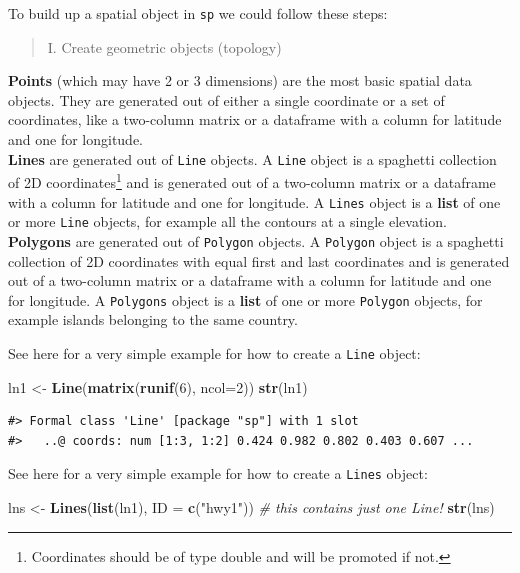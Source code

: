 \documentclass[]{book}
\newenvironment{Shaded}{\begin{snugshade}}{\end{snugshade}}
\newcommand{\KeywordTok}[1]{\textcolor[rgb]{0.13,0.29,0.53}{\textbf{#1}}}
\newcommand{\DataTypeTok}[1]{\textcolor[rgb]{0.13,0.29,0.53}{#1}}
\newcommand{\DecValTok}[1]{\textcolor[rgb]{0.00,0.00,0.81}{#1}}
\newcommand{\StringTok}[1]{\textcolor[rgb]{0.31,0.60,0.02}{#1}}
\newcommand{\CommentTok}[1]{\textcolor[rgb]{0.56,0.35,0.01}{\textit{#1}}}
\newcommand{\NormalTok}[1]{#1}
\let\rmarkdownfootnote\footnote%
\def\footnote{\protect\rmarkdownfootnote}
\theoremstyle{definition}
\theoremstyle{definition}
\theoremstyle{definition}
\theoremstyle{remark}
\begin{document}
To build up a spatial object in \texttt{sp} we could follow these steps:

\begin{quote}
I. Create geometric objects (topology)
\end{quote}

\textbf{Points} (which may have 2 or 3 dimensions) are the most basic
spatial data objects. They are generated out of either a single
coordinate or a set of coordinates, like a two-column matrix or a
dataframe with a column for latitude and one for longitude.\\
\textbf{Lines} are generated out of \texttt{Line} objects. A
\texttt{Line} object is a spaghetti collection of 2D
coordinates\footnote{Coordinates should be of type double and will be
  promoted if not.} and is generated out of a two-column matrix or a
dataframe with a column for latitude and one for longitude. A
\texttt{Lines} object is a \textbf{list} of one or more \texttt{Line}
objects, for example all the contours at a single elevation.\\
\textbf{Polygons} are generated out of \texttt{Polygon} objects. A
\texttt{Polygon} object is a spaghetti collection of 2D coordinates with
equal first and last coordinates and is generated out of a two-column
matrix or a dataframe with a column for latitude and one for longitude.
A \texttt{Polygons} object is a \textbf{list} of one or more
\texttt{Polygon} objects, for example islands belonging to the same
country.

See here for a very simple example for how to create a \texttt{Line}
object:

\begin{Shaded}
\begin{Highlighting}[]
\NormalTok{ln1 <-}\StringTok{ }\KeywordTok{Line}\NormalTok{(}\KeywordTok{matrix}\NormalTok{(}\KeywordTok{runif}\NormalTok{(}\DecValTok{6}\NormalTok{), }\DataTypeTok{ncol=}\DecValTok{2}\NormalTok{))}
\KeywordTok{str}\NormalTok{(ln1)}
\end{Highlighting}
\end{Shaded}

\begin{verbatim}
#> Formal class 'Line' [package "sp"] with 1 slot
#>   ..@ coords: num [1:3, 1:2] 0.424 0.982 0.802 0.403 0.607 ...
\end{verbatim}

See here for a very simple example for how to create a \texttt{Lines}
object:

\begin{Shaded}
\begin{Highlighting}[]
\NormalTok{lns <-}\StringTok{ }\KeywordTok{Lines}\NormalTok{(}\KeywordTok{list}\NormalTok{(ln1), }\DataTypeTok{ID =} \KeywordTok{c}\NormalTok{(}\StringTok{"hwy1"}\NormalTok{)) }\CommentTok{# this contains just one Line!}
\KeywordTok{str}\NormalTok{(lns)}
\end{Highlighting}
\end{Shaded}
\end{document}
